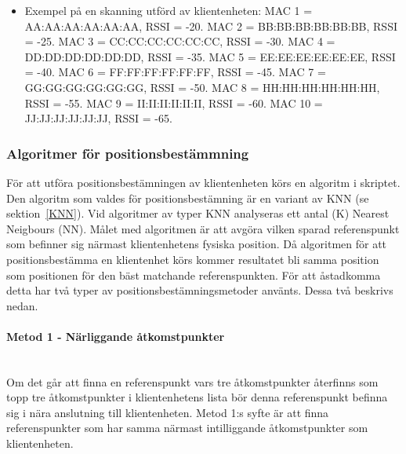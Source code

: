 \documentclass[a4paper,12pt]{article}
\begin{document}
   \begin{itemize}
   \item Exempel på en skanning utförd av klientenheten:
         \newline MAC 1 = AA:AA:AA:AA:AA:AA,  RSSI = -20.
         \newline MAC 2 = BB:BB:BB:BB:BB:BB,  RSSI = -25.
         \newline MAC 3 = CC:CC:CC:CC:CC:CC,  RSSI = -30.
         \newline MAC 4 = DD:DD:DD:DD:DD:DD,  RSSI = -35.
         \newline MAC 5 = EE:EE:EE:EE:EE:EE,  RSSI = -40.
         \newline MAC 6 = FF:FF:FF:FF:FF:FF,  RSSI = -45.
         \newline MAC 7 = GG:GG:GG:GG:GG:GG,  RSSI = -50.
         \newline MAC 8 = HH:HH:HH:HH:HH:HH,  RSSI = -55.
         \newline MAC 9 = II:II:II:II:II:II,  RSSI = -60.
         \newline MAC 10 = JJ:JJ:JJ:JJ:JJ:JJ,  RSSI = -65.
   \end{itemize}

 \subsubsection{Algoritmer för positionsbestämmning}\label{algoritm}
 För att utföra positionsbestämningen av klientenheten körs en algoritm i skriptet. Den algoritm som valdes för positionsbestämning är en variant av KNN (se sektion~\ref{KNN}). Vid algoritmer av typer KNN analyseras ett antal (K) Nearest Neigbours (NN).
 Målet med algoritmen är att avgöra vilken sparad referenspunkt som befinner sig närmast klientenhetens fysiska position. Då algoritmen för att positionsbestämma en klientenhet körs kommer resultatet bli samma position som positionen för den bäst matchande referenspunkten. För att åstadkomma detta har två typer av positionsbestämningsmetoder använts. Dessa två beskrivs nedan.

 \paragraph{Metod 1 - Närliggande åtkomstpunkter}
 \leavevmode\\
 Om det går att finna en referenspunkt vars tre åtkomstpunkter återfinns som topp tre åtkomstpunkter i klientenhetens lista bör denna referenspunkt befinna sig i nära anslutning till klientenheten.
 Metod 1:s syfte är att finna referenspunkter som har samma närmast intilliggande åtkomstpunkter som klientenheten.
\end{document}
